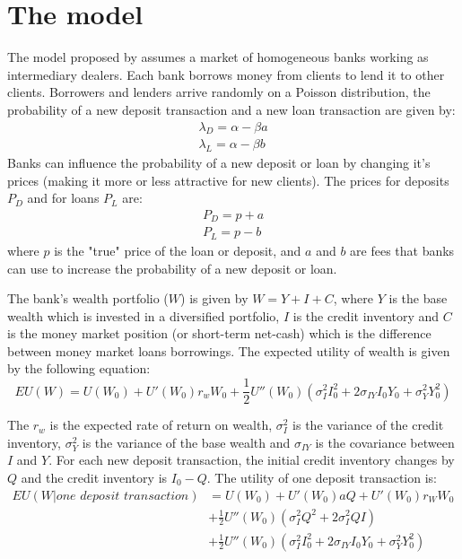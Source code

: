 \chapter{The model}\label{cap_trabalho_academico}

The model proposed by  assumes a market of homogeneous banks working as intermediary dealers. Each bank borrows money from clients to lend it to other clients. Borrowers and lenders arrive randomly on a Poisson distribution, the probability of a new deposit transaction and a new loan transaction are given by: 
\begin{align}
  \lambda_D = \alpha - \beta a \\
  \lambda_L = \alpha - \beta b
\end{align} 
Banks can influence the probability of a new deposit or loan by changing it's prices (making it more or less attractive for new clients). The prices for deposits $P_D$ and for loans $P_L$ are:
\begin{align}
  P_D = p+a \\
  P_L = p-b 
\end{align}
where $p$ is the "true" price of the loan or deposit, and $a$ and $b$ are fees that banks can use to increase the probability of a new deposit or loan.

The bank's wealth portfolio ($W$) is given by $W = Y + I + C$, where $Y$ is the base wealth which is invested in a diversified portfolio, $I$ is the credit inventory and $C$ is the money market position (or short-term net-cash) which is the difference between money market loans borrowings. The expected utility of wealth is given by the following equation:
\begin{equation}
  EU(W) = U(W_0) + U'(W_0)r_w W_0 + \frac{1}{2}U''(W_0)(\sigma_I^2 I_0^2 + 2\sigma_{IY} I_0 Y_0 + \sigma_Y^2 Y_0^2)
\end{equation}

The $r_w$ is the expected rate of return on wealth, $\sigma_I^2$ is the variance of the credit inventory, $\sigma_Y^2$ is the variance of the base wealth and $\sigma_{IY}$ is the covariance between $I$ and $Y$. For each new deposit transaction, the initial credit inventory changes by $Q$ and the credit inventory is $I_0 - Q$. The utility of one deposit transaction is:
\begin{equation}
  \begin{aligned}
    EU(W|\textit{one deposit transaction}) &= U(W_0) + U'(W_0)aQ +  U'(W_0)r_W W_0 \\ &+ \frac{1}{2}U''(W_0)(\sigma_I^2 Q^2 + 2\sigma_I^2 QI) \\ &+\frac{1}{2}U''(W_0)(\sigma_I^2 I_0^2 + 2\sigma_{IY} I_0 Y_0 + \sigma_Y^2 Y_0^2)
  \end{aligned}
\end{equation}

